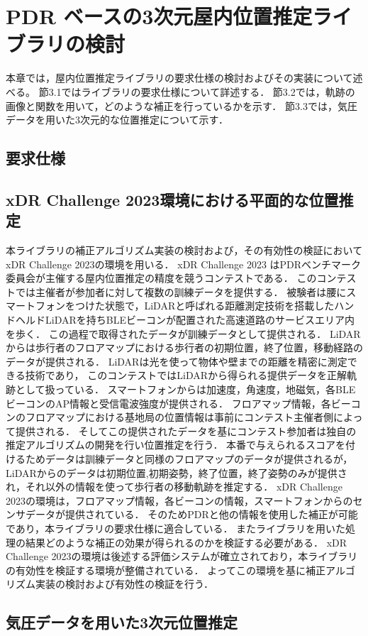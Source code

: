 
\chapter{PDR ベースの3次元屋内位置推定ライブラリの検討}
\thispagestyle{myheadings}
本章では，屋内位置推定ライブラリの要求仕様の検討およびその実装について述べる。
節3.1ではライブラリの要求仕様について詳述する．
節3.2では，軌跡の画像と関数を用いて，どのような補正を行っているかを示す．
節3.3では，気圧データを用いた3次元的な位置推定について示す．

\section{要求仕様}




\section{xDR Challenge 2023環境における平面的な位置推定}

本ライブラリの補正アルゴリズム実装の検討および，その有効性の検証においてxDR Challenge 2023\cite{xdr}の環境を用いる．
xDR Challenge 2023 はPDRベンチマーク委員会が主催する屋内位置推定の精度を競うコンテストである．
このコンテストでは主催者が参加者に対して複数の訓練データを提供する．
被験者は腰にスマートフォンをつけた状態で，LiDARと呼ばれる距離測定技術を搭載したハンドヘルドLiDARを持ちBLEビーコンが配置された高速道路のサービスエリア内を歩く．
この過程で取得されたデータが訓練データとして提供される．
LiDARからは歩行者のフロアマップにおける歩行者の初期位置，終了位置，移動経路のデータが提供される．
LiDARは光を使って物体や壁までの距離を精密に測定できる技術であり，
このコンテストではLiDARから得られる提供データを正解軌跡として扱っている．
スマートフォンからは加速度，角速度，地磁気，各BLEビーコンのAP情報と受信電波強度が提供される．
フロアマップ情報，各ビーコンのフロアマップにおける基地局の位置情報は事前にコンテスト主催者側によって提供される．
そしてこの提供されたデータを基にコンテスト参加者は独自の推定アルゴリズムの開発を行い位置推定を行う．
本番で与えられるスコアを付けるためデータは訓練データと同様のフロアマップのデータが提供されるが，
LiDARからのデータは初期位置,初期姿勢，終了位置，終了姿勢のみが提供され，それ以外の情報を使って歩行者の移動軌跡を推定する．
xDR Challenge 2023の環境は，フロアマップ情報，各ビーコンの情報，スマートフォンからのセンサデータが提供されている．
そのためPDRと他の情報を使用した補正が可能であり，本ライブラリの要求仕様に適合している．
またライブラリを用いた処理の結果どのような補正の効果が得られるのかを検証する必要がある．
xDR Challenge 2023の環境は後述する評価システムが確立されており，本ライブラリの有効性を検証する環境が整備されている．
よってこの環境を基に補正アルゴリズム実装の検討および有効性の検証を行う．









\section{気圧データを用いた3次元位置推定}



